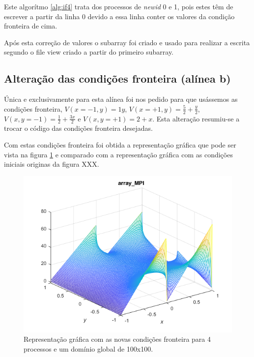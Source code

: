 \documentclass[10pt]{extarticle}
\begin{document}
Este algorítmo \ref{alg:if4} trata dos processos de \textit{newid} 0 e 1, pois estes têm de escrever a partir da linha 0 devido a essa linha conter os valores da condição fronteira de cima.

Após esta correção de valores o subarray foi criado e usado para realizar a escrita segundo o file view criado a partir do primeiro subarray.  

\pagebreak

\subsection{Alteração das condições fronteira (alínea b)}

Única e exclusivamente para esta alínea foi nos pedido para que usássemos as condições fronteira, $V(x=-1,y)=1y$, $V(x=+1,y)=\frac{5}{2}+\frac{y}{2}$, $V(x,y=-1)=\frac{1}{2}+\frac{3x}{2}$ e $V(x,y=+1)=2+x$. Esta alteração resumiu-se a trocar o código das condições fronteira desejadas.

Com estas condições fronteira foi obtida a representação gráfica que pode ser vista na figura \ref{fig:newCondFront} e comparado com a representação gráfica com as condições iniciais originas da figura XXX.

  \begin{figure}[H]
  \centering
  \includegraphics[width=\linewidth/2]{alineab.png}
  \caption{Representação gráfica com as novas condições fronteira para 4 processos e um domínio global de 100x100.}
  \label{fig:newCondFront}
  \end{figure}
  
\end{document}
